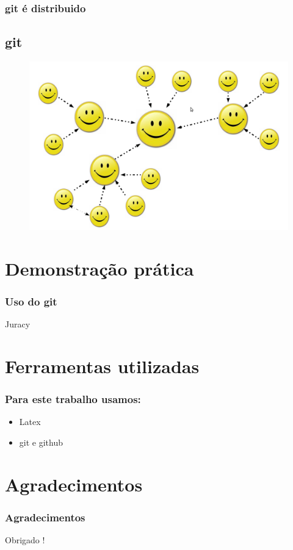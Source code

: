 \documentclass{beamer}
\begin{document}
  \begin{frame}
    \frametitle{git é distribuido}
    \subsection{git}
    \begin{figure}[htb]
     \begin{center}
    	\includegraphics[scale=0.2]{descentralizado.png}
     \end{center}
    \end{figure}
    \vfill
  \end{frame}

  \section{Demonstração prática}
  \begin{frame}
    \frametitle{Uso do git}
    \vfill
      \begin{flushright}
        Juracy
    \end{flushright}
  \end{frame}

  \section{Ferramentas utilizadas}
  \begin{frame}
    \frametitle{Para este trabalho usamos:}
    \begin{itemize}
      \item Latex
      \item git e github
    \end{itemize}
  \end{frame}
  
    \section{Agradecimentos}
    \begin{frame}
        \frametitle{Agradecimentos}
        \begin{center}
            Obrigado !
        \end{center}
    \end{frame}
\end{document}

